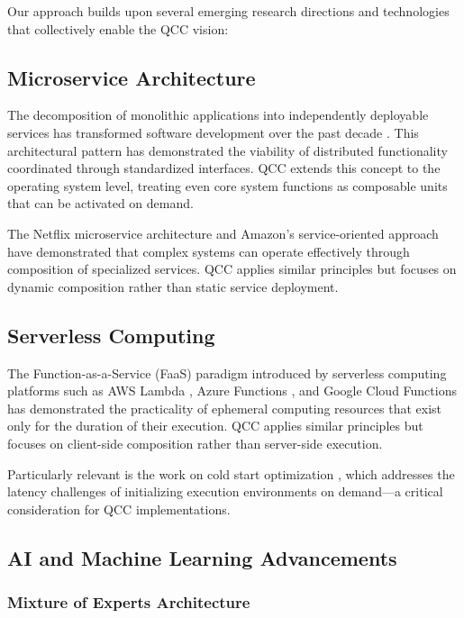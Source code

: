 \documentclass[11pt,a4paper]{article}
\begin{document}
Our approach builds upon several emerging research directions and technologies that collectively enable the QCC vision:

\subsection{Microservice Architecture}

The decomposition of monolithic applications into independently deployable services has transformed software development over the past decade \cite{microservices}. This architectural pattern has demonstrated the viability of distributed functionality coordinated through standardized interfaces. QCC extends this concept to the operating system level, treating even core system functions as composable units that can be activated on demand.

The Netflix microservice architecture \cite{netflix} and Amazon's service-oriented approach \cite{amazon} have demonstrated that complex systems can operate effectively through composition of specialized services. QCC applies similar principles but focuses on dynamic composition rather than static service deployment.

\subsection{Serverless Computing}

The Function-as-a-Service (FaaS) paradigm introduced by serverless computing platforms such as AWS Lambda \cite{lambda}, Azure Functions \cite{azure}, and Google Cloud Functions \cite{google} has demonstrated the practicality of ephemeral computing resources that exist only for the duration of their execution. QCC applies similar principles but focuses on client-side composition rather than server-side execution.

Particularly relevant is the work on cold start optimization \cite{coldstart}, which addresses the latency challenges of initializing execution environments on demand—a critical consideration for QCC implementations.

\subsection{AI and Machine Learning Advancements}

\subsubsection{Mixture of Experts Architecture}
\end{document}
